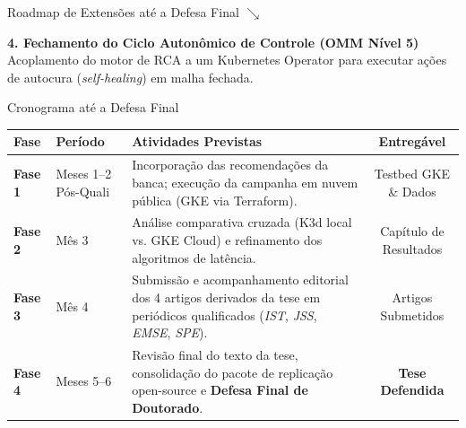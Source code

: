 \documentclass[aspectratio=169, 10pt]{beamer}
\begin{document}
\begin{frame}{Roadmap de Extensões até a Defesa Final}
  \vspace{-0.3ex}
  \hspace{0.21\textwidth}\textcolor{cinBlack}{$\boldsymbol{\searrow}$}\\[-0.5ex]
  \hspace{0.24\textwidth}%
  \begin{minipage}{0.75\textwidth}
    \begin{alertblock}{\scriptsize \textbf{4. Fechamento do Ciclo Autonômico de Controle (OMM Nível 5)}}
      \footnotesize
      Acoplamento do motor de RCA a um Kubernetes Operator para executar ações de autocura (\textit{self-healing}) em malha fechada.
    \end{alertblock}
  \end{minipage}
\end{frame}

\begin{frame}{Cronograma até a Defesa Final}
  \scriptsize
  \renewcommand{\arraystretch}{1.15}
  \begin{tabularx}{\textwidth}{l p{3.2cm} X c}
    \toprule
    \textbf{Fase} & \textbf{Período} & \textbf{Atividades Previstas} & \textbf{Entregável} \\
    \midrule
    \textbf{Fase 1} & Meses 1--2 Pós-Quali & Incorporação das recomendações da banca; execução da campanha em nuvem pública (GKE via Terraform). & Testbed GKE \& Dados \\
    \addlinespace
    \textbf{Fase 2} & Mês 3 & Análise comparativa cruzada (K3d local vs. GKE Cloud) e refinamento dos algoritmos de latência. & Capítulo de Resultados \\
    \addlinespace
    \textbf{Fase 3} & Mês 4 & Submissão e acompanhamento editorial dos 4 artigos derivados da tese em periódicos qualificados (\textit{IST}, \textit{JSS}, \textit{EMSE}, \textit{SPE}). & Artigos Submetidos \\
    \addlinespace
    \textbf{Fase 4} & Meses 5--6 & Revisão final do texto da tese, consolidação do pacote de replicação open-source e \textbf{Defesa Final de Doutorado}. & \textbf{Tese Defendida} \\
    \bottomrule
  \end{tabularx}
\end{frame}
\end{document}

